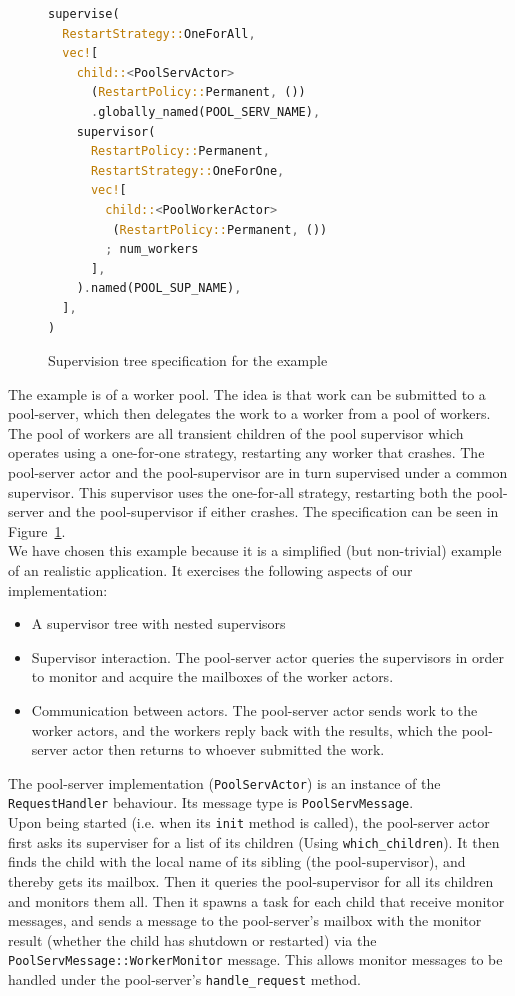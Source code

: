 \documentclass[a4paper]{article}
\newcommand\figref[1]{Figure~\ref{#1}}
\begin{document}
\begin{figure}
\begin{lstlisting}[language=Rust,basicstyle=\footnotesize]
supervise(
  RestartStrategy::OneForAll,
  vec![
    child::<PoolServActor>
      (RestartPolicy::Permanent, ())
      .globally_named(POOL_SERV_NAME),
    supervisor(
      RestartPolicy::Permanent,
      RestartStrategy::OneForOne,
      vec![
        child::<PoolWorkerActor>
         (RestartPolicy::Permanent, ())
        ; num_workers
      ],
    ).named(POOL_SUP_NAME),
  ],
)
\end{lstlisting}
  \caption{Supervision tree specification for the example}
  \label{fig:ex-spec}
\end{figure}

The example is of a worker pool. The idea is that work can be submitted to a
pool-server, which then delegates the work to a worker from a pool of workers.
The pool of workers are all transient children of the pool supervisor which
operates using a one-for-one strategy, restarting any worker that crashes. The
pool-server actor and the pool-supervisor are in turn supervised under a common
supervisor. This supervisor uses the one-for-all strategy, restarting both the
pool-server and the pool-supervisor if either crashes. The specification can be
seen in \figref{fig:ex-spec}.\\

\noindent
We have chosen this example because it is a simplified (but non-trivial) example
of an realistic application. It exercises the following aspects of our
implementation:
\begin{itemize}
\item A supervisor tree with nested supervisors
\item Supervisor interaction. The pool-server actor queries the supervisors in order
  to monitor and acquire the mailboxes of the worker actors.
\item Communication between actors. The pool-server actor sends work to the
  worker actors, and the workers reply back with the results, which the
  pool-server actor then returns to whoever submitted the work.
\end{itemize}

\noindent
The pool-server implementation (\texttt{PoolServActor}) is an instance of the
\texttt{RequestHandler} behaviour. Its message type is
\texttt{PoolServMessage}.\\

\noindent
Upon being started (i.e. when its \texttt{init} method
is called), the pool-server actor first asks its superviser for a list of its
children (Using \texttt{which\_children}). It then finds the child with the
local name of its sibling (the pool-supervisor), and thereby gets its mailbox.
Then it queries the pool-supervisor for all its children and monitors them all.
Then it spawns a task for each child that receive monitor messages, and sends a
message to the pool-server's mailbox with the monitor result (whether the child
has shutdown or restarted) via the \texttt{{PoolServMessage::WorkerMonitor}}
message. This allows monitor messages to be handled under the pool-server's
\texttt{handle\_request} method.\\
\end{document}
